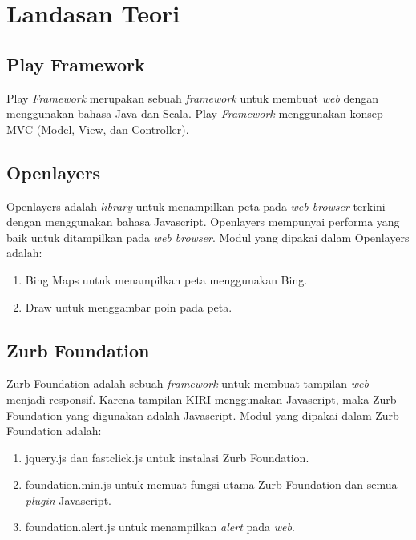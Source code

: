 \chapter{Landasan Teori}
\label{chap:LandasanTeori}

\section{Play Framework}
\label{sec:play}
Play \textit{Framework} merupakan sebuah \textit{framework} untuk membuat \textit{web} dengan menggunakan bahasa Java dan Scala. Play \textit{Framework} menggunakan konsep MVC (Model, View, dan Controller). 

\section{Openlayers}
\label{sec:openlayers}
Openlayers adalah \textit{library} untuk menampilkan peta pada \textit{web browser} terkini dengan menggunakan bahasa Javascript. Openlayers mempunyai performa yang baik untuk ditampilkan pada \textit{web browser}. Modul yang dipakai dalam Openlayers adalah:
\begin{enumerate}
	\item 	Bing Maps untuk menampilkan peta menggunakan Bing.
	\item Draw untuk menggambar poin pada peta.
\end{enumerate}

\section{Zurb Foundation}
\label{sec:foundation}
Zurb Foundation adalah sebuah \textit{framework} untuk membuat tampilan \textit{web} menjadi responsif. Karena tampilan KIRI menggunakan Javascript, maka Zurb Foundation yang digunakan adalah Javascript. Modul yang dipakai dalam Zurb Foundation adalah:
\begin{enumerate}
	\item jquery.js dan fastclick.js untuk instalasi Zurb Foundation.
	\item foundation.min.js untuk memuat fungsi utama Zurb Foundation dan semua \textit{plugin} Javascript.
	\item foundation.alert.js untuk menampilkan \textit{alert} pada \textit{web}.
\end{enumerate}



